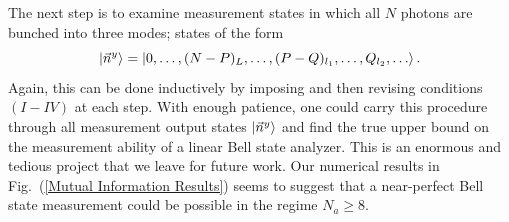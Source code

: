 \documentclass[aps,pra,twocolumn,showpacs,superscriptaddress,floatfix,10pt]{revtex4}
\begin{document}
The next step is to examine measurement states in which all $N$ photons are bunched into three modes; states of the form
\begin{equation}
\label{Measurement Outcome Bunched Three Modes}
\small 	\ket{\vec{n}^y} =\ket{0,\dots,(N-P)_L,\dots,(P-Q)_{l_1},\dots,Q_{l_2},\dots}.
\end{equation} 
Again, this can be done inductively by imposing and then revising conditions $(I-IV)$ at each step. With enough patience, one could carry this procedure through all measurement output states $\ket{\vec{n}^y}$ and find the true upper bound on the measurement ability of a linear Bell state analyzer. This is an enormous and tedious project that we leave for future work. Our numerical results in Fig.~(\ref{Mutual Information Results}) seems to suggest that a near-perfect Bell state measurement could be possible in the regime $N_a \ge 8$.
\end{document}
